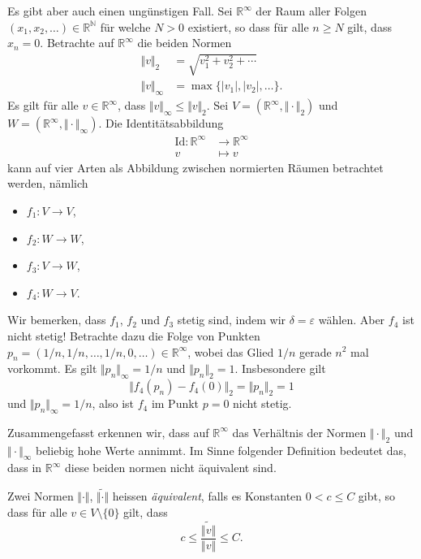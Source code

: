 \documentclass[../main.tex]{subfiles}
\begin{document}
Es gibt aber auch einen ungünstigen Fall.
Sei $\mathbb{R}^{\infty}$ der Raum aller Folgen
$(x_{1}, x_{2}, \dots) \in \mathbb{R}^{\mathbb{N}}$ 
für welche $N > 0$ existiert, so dass für alle $n \geq N$ 
gilt, dass $x_n = 0$.
Betrachte auf $\mathbb{R}^{\infty}$ die beiden Normen
\begin{align*}
  \Vert v \Vert_2 & = \sqrt{v_1^2 + v_2^2 + \cdots} \\
  \Vert v \Vert_{\infty} &= \max \{|v_1|, |v_2|, \dots\}.
\end{align*}
Es gilt für alle $v \in \mathbb{R}^{\infty}$,
dass $\Vert v \Vert_{\infty} \leq \Vert v \Vert_2$.
Sei $V = (\mathbb{R}^{\infty}, \Vert \cdot \Vert_2)$ 
und $W = (\mathbb{R}^{\infty}, \Vert \cdot \Vert_{\infty})$.
Die Identitätsabbildung
\begin{align*}
  \text{Id} \colon \mathbb{R}^{\infty} & \to \mathbb{R}^{\infty} \\
  v & \mapsto v
\end{align*}
kann auf vier Arten als Abbildung zwischen normierten Räumen
betrachtet werden, nämlich
\begin{itemize}
  \item $f_1 \colon V \to V$,
  \item $f_2 \colon W \to W$,
  \item $f_3 \colon V \to W$,
  \item $f_4 \colon W \to V$.
\end{itemize}
Wir bemerken, dass $f_1$, $f_2$ und $f_3$ stetig
sind, indem wir $\delta = \varepsilon$ wählen.
Aber $f_4$ ist nicht stetig!
Betrachte dazu die Folge von Punkten
$p_n = (1/n, 1/n, \dots, 1/n, 0, \dots) \in \mathbb{R}^{\infty}$,
wobei das Glied $1/n$ gerade $n^2$ mal vorkommt.
Es gilt $\Vert p_n \Vert_{\infty} = 1/n$ 
und $\Vert p_n \Vert_{2} = 1$.
Insbesondere gilt
\[
  \Vert f_4(p_n) - f_4(0) \Vert_2 = \Vert p_n \Vert_2 = 1
\]
und $\Vert p_n \Vert_{\infty} = 1/n$,
also ist $f_4$ im Punkt $p = 0$ nicht stetig.

Zusammengefasst erkennen wir, dass auf $\mathbb{R}^{\infty}$ 
das Verhältnis der Normen $\Vert \cdot \Vert_2$ 
und $\Vert \cdot \Vert_{\infty}$ beliebig hohe Werte annimmt.
Im Sinne folgender Definition bedeutet das, dass in
$\mathbb{R}^{\infty}$ diese beiden normen nicht äquivalent sind.

\begin{definition}
  Zwei Normen $\Vert \cdot \Vert$, $\widetilde{\Vert \cdot \Vert}$
  heissen \emph{äquivalent},
  falls es Konstanten $0 < c \leq C$ gibt,
  so dass für alle $v \in V \setminus \{0\}$ gilt, dass
  \[
    c \leq \frac{\widetilde{\Vert v \Vert}}{\Vert v \Vert} \leq C.
  \]
\end{definition}
\end{document}
